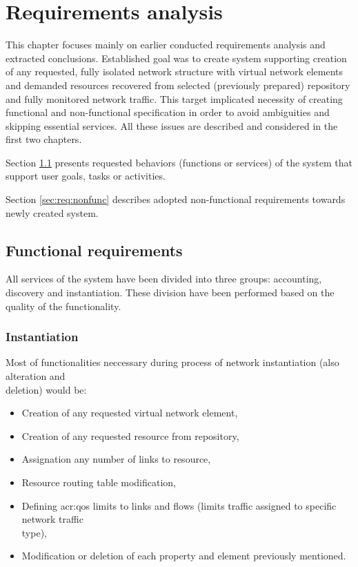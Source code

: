 \documentclass[11pt]{book}
\begin{document}
  \chapter{Requirements analysis}
  \label{chap:req}


    This chapter focuses mainly on earlier conducted requirements analysis and extracted conclusions. Established goal
    was to create system supporting creation of any requested, fully isolated network structure with virtual network
    elements and demanded resources recovered from selected (previously prepared) repository and fully monitored network
    traffic. This target implicated necessity of creating functional and non-functional specification in order to avoid
    ambiguities and skipping essential services. All these issues are described and considered in the first two
    chapters.

    Section \ref{sec:req:func} presents requested behaviors (functions or services) of the system that support user
    goals, tasks or activities.

    Section \ref{sec:req:nonfunc} describes adopted non-functional requirements towards newly created system.


    \section{Functional requirements}
	
		\label{sec:req:func}
		
		All services of the system have been divided into three groups: accounting, discovery and instantiation.
                These division have been performed based on the quality of the functionality.  

      \subsection{Instantiation}
		\label{sec:req:func:inst}
	  
		Most of functionalities neccessary during process of network instantiation (also alteration and \\ deletion) would be:
		
		\begin{itemize}
			\item{Creation of any requested virtual network element, }
			\item{Creation of any requested resource from repository, }
			\item{Assignation any number of links to resource, }
			\item{Resource routing table modification, }
			\item{Defining \gls{acr:qos} limits to links and flows (limits traffic assigned to specific network traffic \\ type), }
			\item{Modification or deletion of each property and element previously mentioned. }
		\end{itemize}
		
\end{document}
